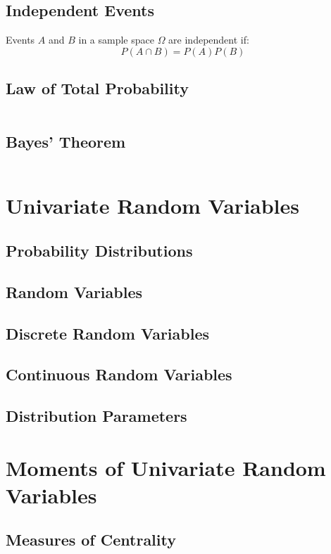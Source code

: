 \documentclass{article}
\begin{document}
\subsection{Independent Events}

Events $A$ and $B$ in a sample space $\Omega$ are independent if:
\[P(A\cap B) = P(A)P(B)\]

\subsection{Law of Total Probability}

\[\]

\subsection{Bayes' Theorem}

\[\]

\newpage
\section{Univariate Random Variables}

\subsection{Probability Distributions}
\subsection{Random Variables}
\subsection{Discrete Random Variables}
\subsection{Continuous Random Variables}
\subsection{Distribution Parameters}

\newpage
\section{Moments of Univariate Random Variables}

\subsection{Measures of Centrality}
\end{document}
